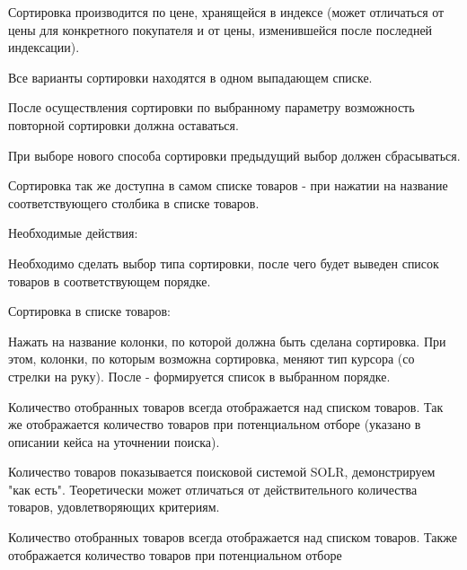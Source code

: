{\begin{itogolong}
Сортировка производится по цене, хранящейся в индексе (может отличаться от цены для конкретного покупателя и от цены, изменившейся после последней индексации).

Все варианты сортировки находятся в одном выпадающем списке.

После осуществления сортировки по выбранному параметру возможность повторной сортировки должна оставаться.

При выборе нового способа сортировки предыдущий выбор должен сбрасываться.

Сортировка так же доступна в самом списке товаров - при нажатии на название соответствующего столбика в списке товаров.

Необходимые действия:

Необходимо сделать выбор типа сортировки, после чего будет выведен список товаров в соответствующем порядке.

Сортировка в списке товаров:

Нажать на название колонки, по которой должна быть сделана сортировка. При этом, колонки, по которым возможна сортировка, меняют тип курсора (со стрелки на руку). После - формируется список в выбранном порядке.

\end{itogolong}

}




{


\begin{wiki}
Количество отобранных товаров всегда отображается над списком товаров.
Так же отображается количество товаров при потенциальном отборе (указано в описании кейса на уточнении поиска).
\end{wiki}

\begin{teamidea}
Количество товаров показывается поисковой системой SOLR, демонстрируем "как есть". Теоретически может отличаться от действительного количества товаров, удовлетворяющих критериям.
\end{teamidea}


\begin{itogo}
Количество отобранных товаров всегда отображается над списком товаров. Также отображается количество товаров при потенциальном отборе
\end{itogo}
}



